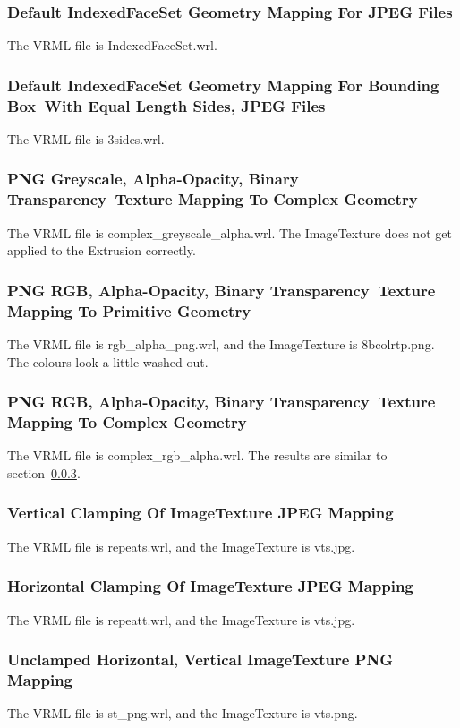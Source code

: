 \documentclass[12pt,letterpaper]{article}
\newcommand{\ITG}{Default IndexedFaceSet Geometry Mapping For JPEG Files}
\newcommand{\ITHa}{Default IndexedFaceSet Geometry Mapping For Bounding Box~}
\newcommand{\ITHb}{With Equal Length Sides, JPEG Files}
\newcommand{\ITVa}{PNG Greyscale, Alpha-Opacity, Binary Transparency~}
\newcommand{\ITVb}{Texture Mapping To Complex Geometry}
\newcommand{\ITWa}{PNG RGB, Alpha-Opacity, Binary Transparency~}
\newcommand{\ITWb}{Texture Mapping To Primitive Geometry}
\newcommand{\ITXa}{PNG RGB, Alpha-Opacity, Binary Transparency~}
\newcommand{\ITXb}{Texture Mapping To Complex Geometry}
\newcommand{\ITAD}{Vertical Clamping Of ImageTexture JPEG Mapping}
\newcommand{\ITAE}{Horizontal Clamping Of ImageTexture JPEG Mapping}
\newcommand{\ITAF}{Unclamped Horizontal, Vertical ImageTexture PNG Mapping}
\begin{document}
\subsubsection{\ITG}
\label{sec:jpeg-ifs}
The VRML file is IndexedFaceSet.wrl.

\subsubsection{\ITHa\ITHb}
The VRML file is 3sides.wrl.

\setcounter{subsubsection}{21}
\subsubsection{\ITVa\ITVb}
\label{sec:png-complex-greyscale}
The VRML file is complex\_greyscale\_alpha.wrl.\newline
The ImageTexture does not get applied to the Extrusion correctly.

\subsubsection{\ITWa\ITWb}
The VRML file is rgb\_alpha\_png.wrl, and the ImageTexture is 8bcolrtp.png.\newline
The colours look a little washed-out.

\subsubsection{\ITXa\ITXb}
The VRML file is complex\_rgb\_alpha.wrl.\newline
The results are similar to section~\ref{sec:png-complex-greyscale}.

\setcounter{subsubsection}{29}
\subsubsection{\ITAD}
\label{sec:vert-clamp}
The VRML file is repeats.wrl, and the ImageTexture is vts.jpg.

\subsubsection{\ITAE}
The VRML file is repeatt.wrl, and the ImageTexture is vts.jpg.

\subsubsection{\ITAF}
The VRML file is st\_png.wrl, and the ImageTexture is vts.png.
\end{document}
